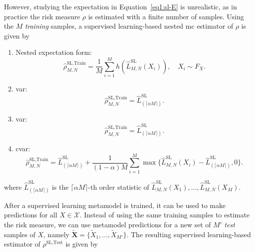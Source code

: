 However, studying the expectation in Equation~\eqref{eq1:sl-E} is unrealistic, as in practice the risk measure $\rho$ is estimated with a finite number of samples.
Using the $M$ \textit{training} samples, a supervised learning-based nested \gls{mc} estimator of $\rho$ is given by

\begin{enumerate}
    \item   Nested expectation form:
            \begin{equation}\label{eq1:sl-train}
                \hat{\rho}^{\text{SL}, \text{Train}}_{M, N} = \frac{1}{M} \sum_{i=1}^M h(\hat{L}^{\text{SL}}_{M, N}(X_i)), \quad X_i \sim F_X.
            \end{equation}
    \item   \gls{var}:
            \begin{equation*}
              \hat{\rho}^{\text{SL}, \text{Train}}_{M, N} = \hat{L}^{\text{SL}}_{(\lceil \alpha M \rceil)}.  
            \end{equation*}
    \item   \gls{var}:
            \begin{equation*}
              \hat{\rho}^{\text{SL}, \text{Train}}_{M, N} = \hat{L}^{\text{SL}}_{(\lceil \alpha M \rceil)}.  
            \end{equation*}
    \item   \gls{cvar}:
            \begin{equation*}
                \hat{\rho}^{\text{SL}, \text{Train}}_{M, N} = \hat{L}^{\text{SL}}_{(\lceil \alpha M \rceil)} + \frac{1}{(1-\alpha) M} \sum_{i=1}^M \max \{\hat{L}^{\text{SL}}_{M, N}(X_i) - \hat{L}^{\text{SL}}_{(\lceil \alpha M \rceil)}, 0 \}.
            \end{equation*}
\end{enumerate}
where $\hat{L}^{\text{SL}}_{(\lceil \alpha M \rceil)}$ is the $\lceil \alpha M \rceil$-th order statistic of $\hat{L}^{\text{SL}}_{M, N}(X_1), \dots, \hat{L}^{\text{SL}}_{M, N}(X_M)$.

After a supervised learning metamodel is trained, it can be used to make predictions for all $X \in \mathcal{X}$.
Instead of using the same training samples to estimate the risk measure, we can use metamodel predictions for a new set of $M'$ \textit{test} samples of $X$, namely $\tilde{\mathbf{X}} = \{\tilde{X}_1, \dots, \tilde{X}_{M'}\}$.
The resulting supervised learning-based estimator of $\rho^{\text{SL}, \text{Test}}$ is given by

